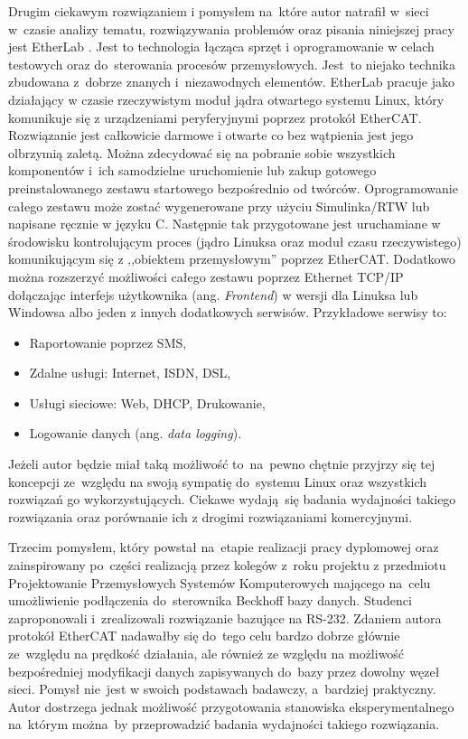 Drugim ciekawym rozwiązaniem i pomysłem na~które autor natrafił w~sieci w~czasie analizy tematu, rozwiązywania problemów oraz pisania niniejszej pracy jest EtherLab \cite{etherlab, ETG_etherlab}. Jest to technologia łącząca sprzęt i oprogramowanie w celach testowych oraz do~sterowania procesów przemysłowych. Jest~to niejako technika zbudowana z~dobrze znanych i~niezawodnych elementów.
EtherLab pracuje jako działający w czasie rzeczywistym moduł jądra otwartego systemu Linux, który komunikuje się z urządzeniami peryferyjnymi poprzez protokół EtherCAT. Rozwiązanie jest całkowicie darmowe i otwarte co bez wątpienia jest jego olbrzymią zaletą. Można zdecydować się na pobranie sobie wszystkich komponentów i~ich samodzielne uruchomienie lub zakup gotowego preinstalowanego zestawu startowego bezpośrednio od twórców. 
Oprogramowanie całego zestawu może zostać wygenerowane przy użyciu Simulinka/RTW lub napisane ręcznie w języku C. Następnie tak przygotowane jest uruchamiane w środowisku kontrolującym proces (jądro Linuksa oraz moduł czasu rzeczywistego) komunikującym się z ,,obiektem przemysłowym'' poprzez EtherCAT. Dodatkowo można rozszerzyć możliwości całego zestawu poprzez Ethernet TCP/IP dołączając interfejs użytkownika (ang. \textit{Frontend}) w wersji dla Linuksa lub Windowsa albo jeden z innych dodatkowych serwisów. Przykładowe serwisy to:
\begin{itemize}
\item Raportowanie poprzez SMS,
\item Zdalne usługi: Internet, ISDN, DSL,
\item Usługi sieciowe: Web, DHCP, Drukowanie,
\item Logowanie danych (ang. \textit{data logging}).
\end{itemize}
Jeżeli autor będzie miał taką możliwość to~na~pewno chętnie przyjrzy się tej koncepcji ze~względu na swoją sympatię do~systemu Linux oraz wszystkich rozwiązań go wykorzystujących. Ciekawe wydają~się badania wydajności takiego rozwiązania oraz porównanie ich z drogimi rozwiązaniami komercyjnymi.

Trzecim pomysłem, który powstał na~etapie realizacji pracy dyplomowej oraz zainspirowany po~części realizacją przez kolegów z~roku projektu z przedmiotu Projektowanie Przemysłowych Systemów Komputerowych mającego na~celu umożliwienie podłączenia do~sterownika Beckhoff bazy danych. Studenci zaproponowali i~zrealizowali rozwiązanie bazujące na RS-232. Zdaniem autora protokół EtherCAT nadawałby się do~tego celu bardzo dobrze głównie ze~względu na prędkość działania, ale również ze względu na możliwość bezpośredniej modyfikacji danych zapisywanych do~bazy przez dowolny węzeł sieci. Pomysł nie~jest w swoich podstawach badawczy, a~bardziej praktyczny. Autor dostrzega jednak możliwość przygotowania stanowiska eksperymentalnego na~którym można~by przeprowadzić badania wydajności takiego rozwiązania.

